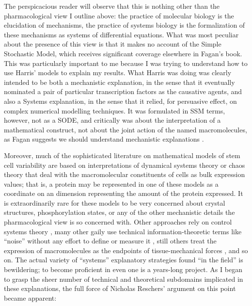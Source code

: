 The perspicacious reader will observe that this is nothing other than the pharmacological view I outline above: the practice of molecular biology is the elucidation of mechanisms, the practice of systems biology is the formalization of these mechanisms as systems of differential equations. What was most peculiar about the presence of this view is that it makes no account of the Simple Stochastic Model, which receives significant coverage elsewhere in Fagan's book. This was particularly important to me because I was trying to understand how to use Harris' models to explain my results. What Harris was doing was clearly intended to be both a mechanistic explanation, in the sense that it eventually nominated a pair of particular transcription factors as the causative agents, and also a Systems explanation, in the sense that it relied, for persuasive effect, on complex numerical modelling techniques. It was formulated in SSM terms, however, not as a SODE, and critically was about the interpretation of a mathematical construct, not about the joint action of the named macromolecules, as Fagan suggests we should understand mechanistic explanations \cite{Fagan2013}.

Moreover, much of the sophisticated literature on mathematical models of stem cell variability are based on interpretations of dynamical systems theory or chaos theory \cite{Furusawa2012,Huang2017} that deal with the macromolecular constituents of cells as bulk expression values; that is, a protein may be represented in one of these models as a coordinate on an dimension representing the amount of the protein expressed. It is extraordinarily rare for these models to be very concerned about crystal structures, phosphorylation states, or any of the other mechanistic details the pharmacological view is so concerned with. Other approaches rely on control systems theory \cite{Sun2015,Yang2015a}, many other gaily use technical information-theoretic terms like ``noise'' without any effort to define or measure it \cite{Chang2008}, still others treat the expression of macromolecules as the endpoints of tissue-mechanical forces \cite{Peng2017}, and so on. The actual variety of ``systems'' explanatory strategies found ``in the field'' is bewildering; to become proficient in even one is a years-long project. As I began to grasp the sheer number of technical and theoretical subdomains implicated in these explanations, the full force of Nicholas Reschers' argument on this point became apparent: 

